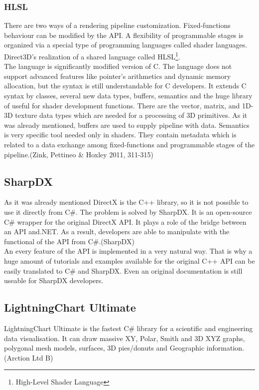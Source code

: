 \documentclass[twoside, english, 11pt]{report}
\begin{document}
\subsubsection{HLSL}
There are two ways of a rendering pipeline customization. Fixed-functions behaviour can be modified by the API. A flexibility of programmable stages is organized via a special type of programming languages called shader languages. Direct3D's realization of a shared language called HLSL\footnote{High-Level Shader Language}.\\

The language is significantly modified version of C. The language does not support advanced features like pointer's arithmetics and dynamic memory allocation, but the syntax is still understandable for C developers. It extends C syntax by classes, several new data types, buffers, semantics and the huge library of useful for shader development functions. There are the vector, matrix, and 1D-3D texture data types which are needed for a processing of 3D primitives. As it was already mentioned, buffers are used to supply pipeline with data. Semantics is very specific tool needed only in shaders. They contain metadata which is related to a data exchange among fixed-functions and programmable stages of the pipeline.(Zink, Pettineo \& Hoxley 2011, 311-315)
\subsection{SharpDX}

As it was already mentioned DirectX is the C++ library, so it is not possible to use it directly from C\#. The problem is solved by SharpDX. It is an open-source C\# wrapper for the original DirectX API. It plays a role of the bridge between an API and.NET. As a result, developers are able to manipulate with the functional of the API from C\#.(SharpDX)\\

An every feature of the API is implemented in a very natural way. That is why a huge amount of tutorials and examples available for the original C++ API can be easily translated to C\# and SharpDX. Even an original documentation is still useable for SharpDX developers.

\subsection{LightningChart Ultimate}

LightningChart Ultimate is the fastest C\# library for a scientific and engineering data visualisation. It can draw massive XY, Polar, Smith and 3D XYZ graphs, polygonal mesh models, surfaces, 3D pies/donuts and Geographic information. (Arction Ltd B)
\end{document}
